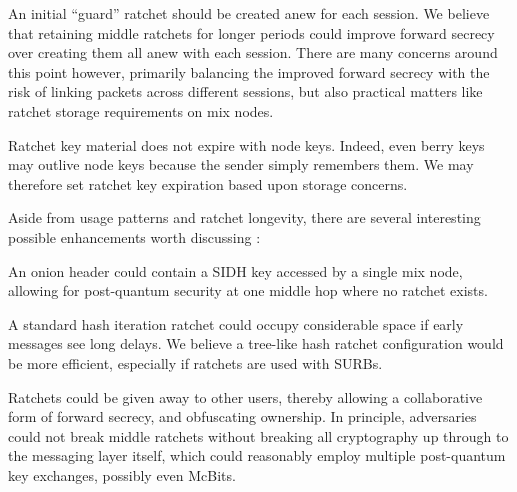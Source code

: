 \documentclass[twoside,letterpaper]{llncs}
\begin{document}
An initial ``guard'' ratchet should be created anew for each session.
We believe that retaining middle ratchets for longer periods could
improve forward secrecy over creating them all anew with each session. 
There are many concerns around this point however, primarily balancing
the improved forward secrecy with the risk of linking packets across
different sessions, but
 also practical matters like ratchet storage requirements on mix nodes.  

Ratchet key material does not expire with node keys.  Indeed, even berry
keys may outlive node keys because the sender simply remembers them.
We may therefore set ratchet key expiration based upon storage concerns. 





Aside from usage patterns and ratchet longevity,
there are several interesting possible enhancements worth discussing : 

An onion header could contain a SIDH key accessed by a single mix node,
allowing for post-quantum security at one middle hop
 where no ratchet exists.

A standard hash iteration ratchet could occupy considerable space
 if early messages see long delays. 
We believe a tree-like hash ratchet configuration would be more efficient,
 especially if ratchets are used with SURBs.

Ratchets could be given away to other users, thereby allowing a
collaborative form of forward secrecy, and obfuscating ownership. 
In principle, adversaries could not break middle ratchets without
breaking all cryptography up through to the messaging layer itself,
which could reasonably employ multiple post-quantum key exchanges,
 possibly even McBits.







\end{document}
